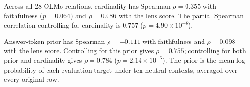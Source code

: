 Across all 28 OLMo relations, cardinality has Spearman $\rho=0.355$ with faithfulness ($p=0.064$) and $\rho=0.086$ with the lens score. The partial Spearman correlation controlling for cardinality is $0.757$ ($p=4.90\times10^{-6}$).

Answer-token prior has Spearman $\rho=-0.111$ with faithfulness and $\rho=0.098$ with the lens score. Controlling for this prior gives $\rho=0.755$; controlling for both prior and cardinality gives $\rho=0.784$ ($p=2.14\times10^{-6}$). The prior is the mean log probability of each evaluation target under ten neutral contexts, averaged over every original row.
